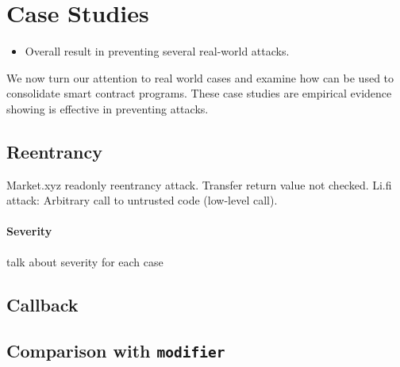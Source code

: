 \section{Case Studies} \label{sec:case}
\begin{itemize}
	\item Overall result in preventing several real-world attacks.
\end{itemize}

We now turn our attention to real world cases and examine how \lang
can be used to consolidate smart contract programs.
These case studies are empirical evidence showing \lang is effective
in preventing attacks.

\subsection{Reentrancy}
Market.xyz readonly reentrancy attack.
Transfer return value not checked.
Li.fi attack: Arbitrary call to untrusted code (low-level call).

\paragraph{Severity} talk about severity for each case

\subsection{Callback}

\subsection{Comparison with \texttt{modifier}}


